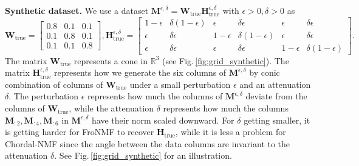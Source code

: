 \documentclass[sn-mathphys-num]{sn-jnl}
\def\IR  {\mathbb{R}} 	    %
\def\H {\bm{H}}
\def\M {\bm{M}}
\def\W {\bm{W}}
\begin{document}
\noindent\textbf{Synthetic dataset.} 
We use a dataset $\M^{\epsilon,\delta} = \W_{\text{true}} \H_{\text{true}}^{\epsilon,\delta}$ with $\epsilon >0, \delta >0$ as
\[
\W_{\text{true}}
=
\begin{bmatrix}
 0.8 & 0.1 & 0.1
 \\
 0.1 & 0.8 & 0.1
 \\
 0.1 & 0.1 & 0.8
\end{bmatrix},
\H_{\text{true}}^{\epsilon,\delta}
=
\begin{bmatrix}
1-\epsilon & \delta( 1-\epsilon) & \epsilon   & \delta\epsilon   & \epsilon   & \delta\epsilon
\\
\epsilon   & \delta\epsilon   & 1-\epsilon & \delta(1-\epsilon) & \epsilon   & \delta\epsilon 
\\
\epsilon   & \delta\epsilon   & \epsilon   & \delta\epsilon   & 1-\epsilon & \delta(1-\epsilon) 
\end{bmatrix}.
\]
The matrix $\W_{\text{true}}$ represents a cone in $\IR^3$ (see Fig.\,\ref{fig:grid_synthetic}).
The matrix $\H_{\text{true}}^{\epsilon,\delta}$ represents how we generate the six columns of $\M^{\epsilon,\delta}$ by conic combination of columns of $\W_{\text{true}}$ under a small perturbation $\epsilon$ and an attenuation $\delta$.
The perturbation $\epsilon$ represents how much the columns of $\M^{\epsilon,\delta}$ deviate from the columns of $\W_{\text{true}}$, while the attenuation $\delta$ represents how much the columns $\M_{:2}, \M_{:4}, \M_{:6}$ in $\M^{\epsilon,\delta}$ have their norm scaled downward.
For $\delta$ getting smaller, it is getting harder for FroNMF to recover $\H_{\text{true}}$, while it is less a problem for Chordal-NMF since the angle between the data columns are invariant to the attenuation $\delta$.
See Fig.\,\ref{fig:grid_synthetic} for an illustration.
\end{document}
